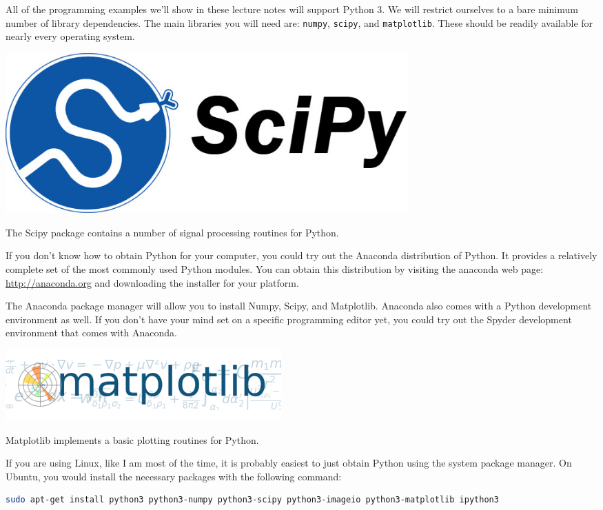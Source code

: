 All of the programming examples we'll show in these lecture notes will
support Python 3. We will restrict ourselves to a bare minimum number
of library dependencies. The main libraries you will need are:
\verb|numpy|, \verb|scipy|, and \verb|matplotlib|. These should be
readily available for nearly every operating system.

\begin{marginfigure}
\begin{center}
\includegraphics[width=0.68\textwidth]{ch02/figures/scipy.jpg}
\end{center}
\caption{The Scipy package contains a number of signal processing routines for Python.}
\end{marginfigure}

If you don't know how to obtain Python for your computer, you could
try out the Anaconda distribution of Python. It provides a relatively
complete set of the most commonly used Python modules. You can obtain
this distribution by visiting the anaconda web page:
\url{http://anaconda.org} and downloading the installer for your
platform.

The Anaconda package manager will allow you to install Numpy, Scipy,
and Matplotlib. Anaconda also comes with a Python development
environment as well. If you don't have your mind set on a specific
programming editor yet, you could try out the Spyder development
environment that comes with Anaconda.

\begin{marginfigure}
\includegraphics[width=\textwidth]{ch02/figures/matplotlib.png}
\caption{Matplotlib implements a basic plotting routines for Python.}
\end{marginfigure}

If you are using Linux, like I am most of the time, it is
probably easiest to just obtain Python using the system package
manager. On Ubuntu, you would install the necessary packages with the following command:
\begin{lstlisting}[language=sh,caption=Installing Python on Ubuntu Linux,label=lst:linuxinstall]
sudo apt-get install python3 python3-numpy python3-scipy python3-imageio python3-matplotlib ipython3
\end{lstlisting}

